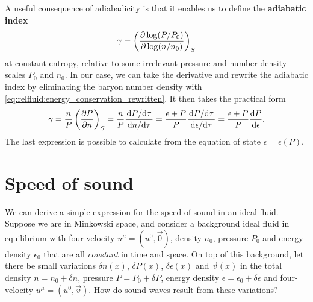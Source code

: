 A useful consequence of adiabadicity is that it enables us to define the \textbf{adiabatic index}
\begin{equation}
	\gamma = \left( \pdv{\log (P/P_0)}{\log (n/n_0)} \right)_S
\end{equation}
at constant entropy, relative to some irrelevant pressure and number density scales $P_0$ and $n_0$.
In our case, we can take the derivative and rewrite the adiabatic index by eliminating the baryon number density with \cref{eq:relfluid:energy_conservation_rewritten}.
It then takes the practical form
\begin{equation}
	\gamma = \frac{n}{P} \left( \pdv{P}{n} \right)_S
	       = \frac{n}{P} \frac{\odv{P}/{\tau}}{\odv{n}/{\tau}}
	       = \frac{\epsilon+P}{P} \frac{\odv{P}/{\tau}}{\odv{\epsilon}/{\tau}}
	       = \frac{\epsilon+P}{P} \odv{P}{\epsilon} .
\label{eq:relfluid:adiabadicity}
\end{equation}
The last expression is possible to calculate from the equation of state $\epsilon = \epsilon(P)$.

\section{Speed of sound}

We can derive a simple expression for the speed of sound in an ideal fluid.
Suppose we are in Minkowski space, and consider a background ideal fluid in equilibrium with four-velocity $u^\mu = (u^0, \vec{0})$, density $n_0$, pressure $P_0$ and energy density $\epsilon_0$ that are all \emph{constant} in time and space.
On top of this background, let there be small variations $\delta n(x)$, $\delta P(x)$, $\delta \epsilon(x)$ and $\vec{v}(x)$ in the total density $n = n_0 + \delta n$, pressure $P = P_0 + \delta P$, energy density $\epsilon = \epsilon_0 + \delta \epsilon$ and four-velocity $u^\mu = (u^0, \vec{v})$.
How do sound waves result from these variations?

